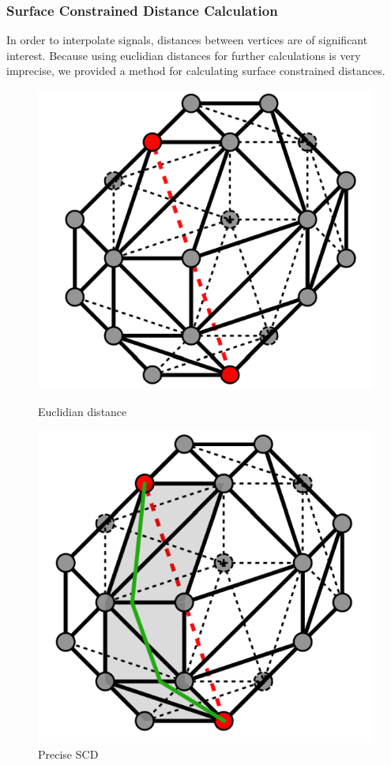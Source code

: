 \subsubsection{Surface Constrained Distance Calculation}

In order to interpolate signals, distances between vertices are of significant interest. Because using euclidian distances for further calculations is very imprecise, we provided a method for calculating surface constrained distances.

\begin{figure}[h]
	\centering
	\begin{minipage}[b]{0.46\textwidth}
		\includegraphics[width=\textwidth]{figures/scdcEuclid.png}
		\caption{Euclidian distance}
	\end{minipage}
	\hfill
	\begin{minipage}[b]{0.46\textwidth}
		\includegraphics[width=\textwidth]{figures/scdcPrecise.png}
		\caption{Precise SCD}
	\end{minipage}
\end{figure}

